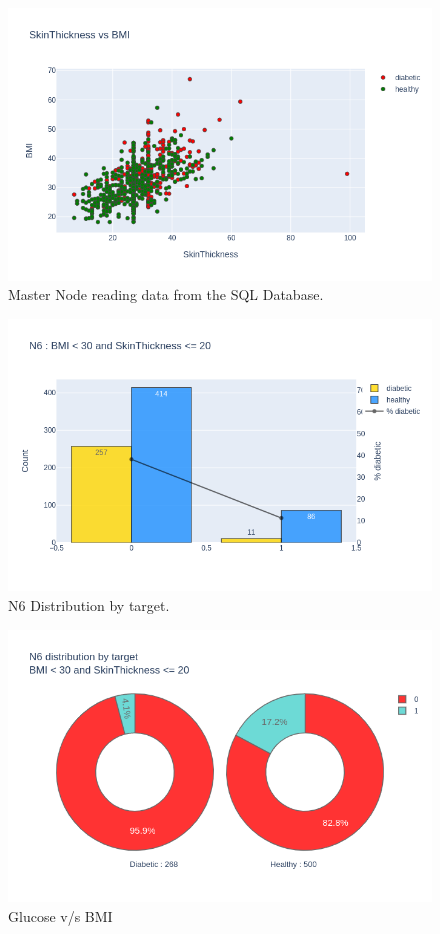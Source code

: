 \documentclass[12pt]{article}
\begin{document}
\begin{figure}[ht]
\centering
\includegraphics[width=1\textwidth]{newplot(25).png}
\caption{Master Node reading data from the SQL Database.}
\end{figure}

\begin{figure}[ht]
\centering
\includegraphics[width=1\textwidth]{newplot(26).png}
\caption{N6 Distribution by target.}
\end{figure}

\begin{figure}[ht]
\centering
\includegraphics[width=1\textwidth]{newplot(27).png}
\caption{Glucose v/s BMI}
\end{figure}
\end{document}

